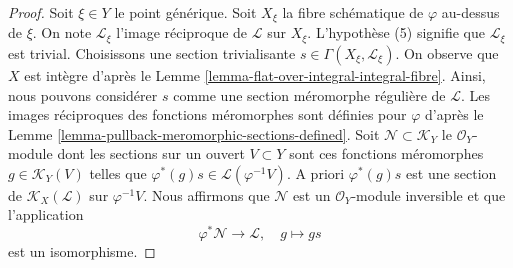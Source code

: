 \begin{proof}
Soit  $\xi \in Y$  le point générique. Soit  $X_\xi$  la fibre schématique de
 $\varphi$  au-dessus de  $\xi$. On note  $\mathcal{L}_\xi$  l'image réciproque de
 $\mathcal{L}$  sur  $X_\xi$. L'hypothèse (5) signifie que  $\mathcal{L}_\xi$  est
trivial. Choisissons une section trivialisante  $s \in \Gamma(X_\xi, \mathcal{L}_\xi)$. On observe que
 $X$  est intègre d'après le Lemme  \ref{lemma-flat-over-integral-integral-fibre}. Ainsi, nous pouvons
considérer  $s$  comme une section méromorphe régulière de  $\mathcal{L}$.
Les images réciproques des fonctions méromorphes sont définies pour  $\varphi$ 
d'après le Lemme  \ref{lemma-pullback-meromorphic-sections-defined}. Soit  $\mathcal{N} \subset \mathcal{K}_Y$  le  $\mathcal{O}_Y$-module dont les
sections sur un ouvert  $V \subset Y$  sont ces fonctions méromorphes  $g \in \mathcal{K}_Y(V)$ 
telles que  $\varphi^*(g)s \in \mathcal{L}(\varphi^{-1}V)$. A priori  $\varphi^*(g)s$  est une section de  $\mathcal{K}_X(\mathcal{L})$  sur
 $\varphi^{-1}V$. Nous affirmons que  $\mathcal{N}$  est un  $\mathcal{O}_Y$-module
inversible et que l'application
$$
\varphi^*\mathcal{N} \longrightarrow \mathcal{L},\quad
g \longmapsto gs
$$
est un isomorphisme.


\end{proof}
